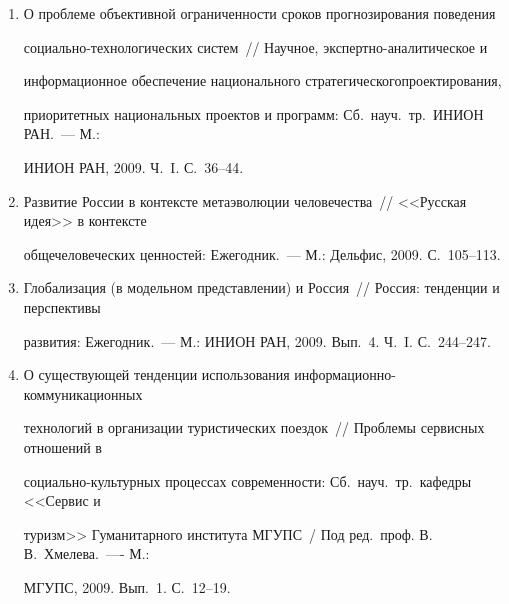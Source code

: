 \begin{enumerate}[1.]
моделирование в низкотемпературной плазме. Ч.~3.~--- М.: Янус-К, 2009. С.~580--597.





\item {}


О проблеме объективной ограниченности сроков прогнозирования поведения 


со\-ци\-аль\-но-тех\-но\-ло\-ги\-че\-ских систем~// Научное, экспертно-аналитическое и 


информационное обеспечение национального стратегического\linebreak проектирования, 


приоритетных национальных проектов и программ: Сб.\ науч.\ тр.\ ИНИОН РАН.~--- М.: 


ИНИОН РАН, 2009. Ч.~I. С.~36--44.





\item {}


Развитие России в контексте метаэволюции человечества~// <<Русская идея>> в контексте 


общечеловеческих ценностей: Ежегодник.~--- М.: Дельфис, 2009. С.~105--113.





\item {}


Глобализация (в модельном представлении) и Россия~// Россия: тенденции и перспективы 


развития: Ежегодник.~--- М.: ИНИОН РАН, 2009. Вып.~4. Ч.~I. С.~244--247. 





\item {}


О существующей тенденции использования информационно-коммуникационных 


технологий в организации туристических поездок~// Проблемы сервисных отношений в 


социально-культурных процессах современности: Сб.\ науч.\ тр.\ кафедры <<Сервис и 


туризм>> Гуманитарного института МГУПС~/ Под ред.\ проф. В.\,В.~Хмелева.~---- М.: 


МГУПС, 2009. Вып.~1. С.~12--19.






\end{enumerate}

